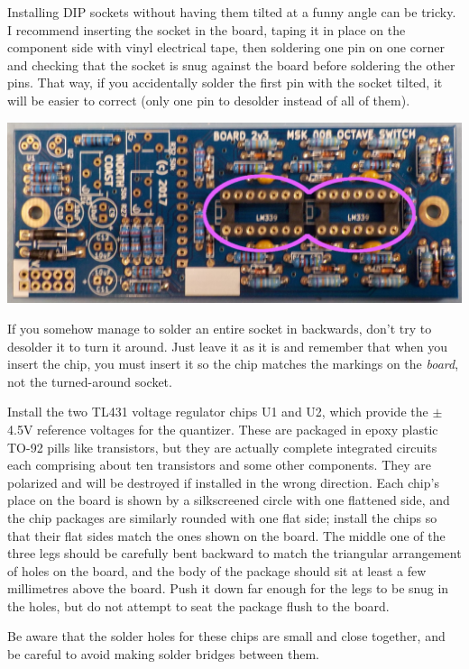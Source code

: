 Installing DIP sockets without having them tilted at a funny angle can be
tricky.  I recommend inserting the socket in the board, taping it in place
on the component side with vinyl electrical tape, then soldering one pin on
one corner and checking that the socket is snug against the board before
soldering the other pins.  That way, if you accidentally solder the first
pin with the socket tilted, it will be easier to correct (only one pin to
desolder instead of all of them).

\noindent\includegraphics[width=\linewidth]{dip2.jpg}

If you somehow manage to solder an entire socket in backwards, don't try to
desolder it to turn it around.  Just leave it as it is and remember that
when you insert the chip, you must insert it so the chip matches the
markings on the \emph{board}, not the turned-around socket.

Install the two TL431 voltage regulator chips U1 and U2, which provide the
$\pm$4.5V reference voltages for the quantizer.  These are packaged
in epoxy plastic TO-92 pills like transistors, but they are actually
complete integrated circuits each comprising about ten transistors and some
other components.  They are polarized and will be destroyed if installed in
the wrong direction.  Each chip's place on the board is shown by a
silkscreened circle with one flattened side, and the chip packages are
similarly rounded with one flat side; install the chips so that their flat
sides match the ones shown on the board.  The middle one of the three legs
should be carefully bent backward to match the triangular arrangement of
holes on the board, and the body of the package should sit at least a few
millimetres above the board.  Push it down far enough for the legs to be
snug in the holes, but do not attempt to seat the package flush to
the board.

\pagebreak

Be aware that the solder holes for these chips are small and close together,
and be careful to avoid making solder bridges between them.

